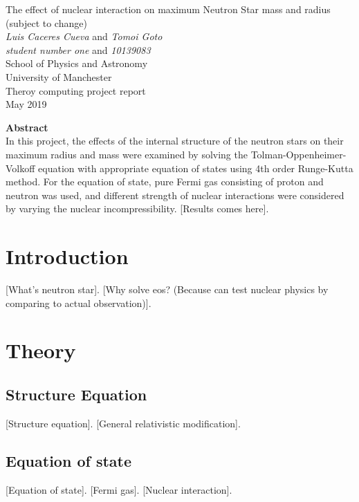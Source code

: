 \documentclass[11pt]{article}
\begin{document}
\begin{titlepage}
\begin{center}
{\Huge The effect of nuclear interaction on maximum Neutron Star mass and radius (subject to change)  }\\[0.5cm]
\textit{Luis Caceres Cueva} and \textit{Tomoi Goto}~\\[0.3cm]
\textit{student number one} and \textit{10139083}~\\[0.3cm]
School of Physics and Astronomy~\\[0.3cm]
University of Manchester~\\[0.3cm]
Theroy computing project report~\\[0.3cm]
May 2019~\\[2cm]

\end{center}
{\Large \textbf{Abstract}}~\\[0.3cm]
In this project, the effects of the internal structure of the neutron stars on their maximum radius and mass were examined by solving the Tolman-Oppenheimer-Volkoff equation with appropriate equation of states using 4th order Runge-Kutta method. For the equation of state, pure Fermi gas consisting of proton and neutron was used, and different strength of nuclear interactions were considered by varying the nuclear incompressibility. [Results comes here].
\end{titlepage}
\clearpage
{}
\setcounter{page}{2}

\newpage

\section{Introduction}
[What's neutron star]. 
[Why solve eos? (Because can test nuclear physics by comparing to actual observation)].
\label{intro}


\section{Theory}

\subsection{Structure Equation }
[Structure equation]. [General relativistic modification]. 
\subsection{Equation of state}
[Equation of state]. [Fermi gas]. [Nuclear interaction].
\end{document}
